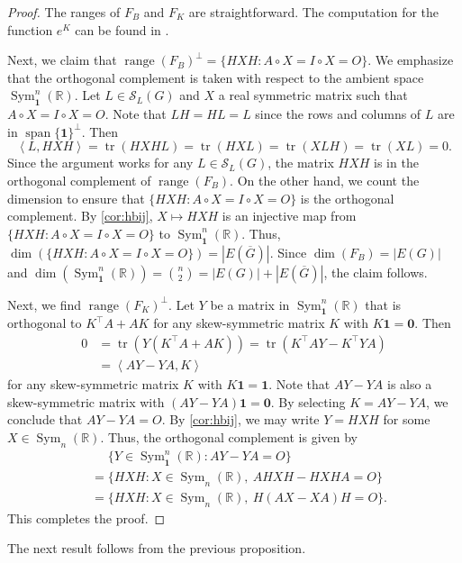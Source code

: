 \documentclass{article}
\theoremstyle{definition}
\newcommand{\trans}{^\top}
\newcommand{\inp}[2]{\left\langle#1,#2\right\rangle}
\newcommand{\bzero}{\mathbf{0}}
\newcommand{\bone}{\mathbf{1}}
\newcommand{\tr}{\operatorname{tr}}
\newcommand{\range}{\operatorname{range}}
\newcommand{\vspan}{\operatorname{span}}
\newcommand{\msym}[1][n]{\operatorname{Sym}_{#1}(\mathbb{R})}
\newcommand{\msymz}[1][n]{\operatorname{Sym}_{\bone}^{#1}(\mathbb{R})}
\newcommand{\mptn}{\mathcal{S}}
\begin{document}
\begin{proof}
The ranges of $F_B$ and $F_K$ are straightforward.  The computation for the function $e^K$ can be found in \cite[Example~2.1]{bifur}.

Next, we claim that $\range(F_B)^{\perp} = \{HXH: A\circ X = I \circ X = O\}$.  We emphasize that the orthogonal complement is taken with respect to the ambient space $\msymz$.  Let $L\in\mptn_L(G)$ and $X$ a real symmetric matrix such that $A\circ X = I\circ X = O$.  Note that $LH = HL = L$ since the rows and columns of $L$ are in $\vspan\{\bone\}^\perp$.  Then 
\[
    \inp{L}{HXH} = \tr(HXHL) = \tr(HXL) = \tr(XLH) = \tr(XL) = 0.
\]
Since the argument works for any $L\in\mptn_L(G)$, the matrix $HXH$ is in the orthogonal complement of $\range(F_B)$.  On the other hand, we count the dimension to ensure that $\{HXH: A\circ X = I\circ X = O\}$ is the orthogonal complement.  By \cref{cor:hbij}, $X\mapsto HXH$ is an injective map from $\{HXH: A\circ X = I\circ X = O\}$ to $\msymz$.  Thus, $\dim(\{HXH: A\circ X = I\circ X = O\}) = |E(\overline{G})|$.  Since $\dim(F_B) = |E(G)|$ and $\dim(\msymz) = \binom{n}{2} = |E(G)| + |E(\overline{G})|$, the claim follows.

Next, we find $\range(F_K)^{\perp}$.  Let $Y$ be a matrix in $\msymz$ that is orthogonal to $K\trans A + AK$ for any skew-symmetric matrix $K$ with $K\bone = \bzero$.  Then 
\[
    \begin{aligned}
        0 &= \tr(Y(K\trans A + AK)) = \tr(K\trans AY - K\trans YA) \\
        &= \inp{AY - YA}{K}
    \end{aligned}
\]
for any skew-symmetric matrix $K$ with $K\bone = \bone$.  Note that $AY - YA$ is also a skew-symmetric matrix with $(AY - YA)\bone = \bzero$.  By selecting $K = AY - YA$, we conclude that $AY - YA = O$.  By \cref{cor:hbij}, we may write $Y = HXH$ for some $X\in\msym$.  Thus, the orthogonal complement is given by 
\[
    \begin{aligned}
        &\mathrel{\phantom{=}}\{Y \in \msymz: AY - YA = O\} \\
      & = \{HXH: X\in\msym,\ AHXH - HXHA = O\} \\
        & =\{HXH: X\in\msym,\ H(AX - XA)H = O\}.
    \end{aligned}
\]
This completes the proof.
\end{proof}

The next result follows from the previous proposition.
\end{document}
